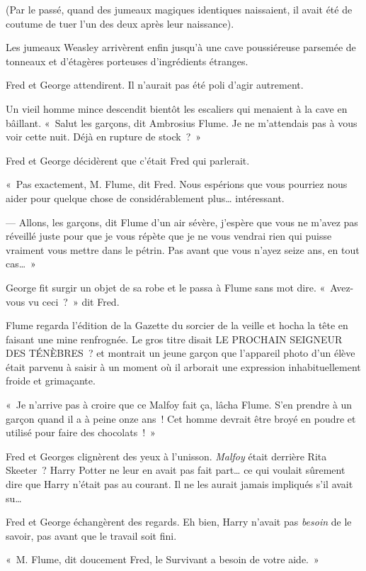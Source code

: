 (Par le passé, quand des jumeaux magiques identiques naissaient, il avait été de coutume de tuer l'un des deux après leur naissance).

Les jumeaux Weasley arrivèrent enfin jusqu'à une cave poussiéreuse parsemée de tonneaux et d'étagères porteuses d'ingrédients étranges.

Fred et George attendirent.
Il n'aurait pas été poli d'agir autrement.

Un vieil homme mince descendit bientôt les escaliers qui menaient à la cave en bâillant.
«~Salut les garçons, dit Ambrosius Flume.
Je ne m'attendais pas à vous voir cette nuit.
Déjà en rupture de stock~?~»

Fred et George décidèrent que c'était Fred qui parlerait.

«~Pas exactement, M. Flume, dit Fred.
Nous espérions que vous pourriez nous aider pour quelque chose de considérablement plus… intéressant.

--- Allons, les garçons, dit Flume d'un air sévère, j'espère que vous ne m'avez pas réveillé juste pour que je vous répète que je ne vous vendrai rien qui puisse vraiment vous mettre dans le pétrin.
Pas avant que vous n'ayez seize ans, en tout cas…~»

George fit surgir un objet de sa robe et le passa à Flume sans mot dire.
«~Avez-vous vu ceci~?~»
dit Fred.

Flume regarda l'édition de la Gazette du sorcier de la veille et hocha la tête en faisant une mine renfrognée.
Le gros titre disait LE PROCHAIN SEIGNEUR DES TÉNÈBRES~? et montrait un jeune garçon que l'appareil photo d'un élève était parvenu à saisir à un moment où il arborait une expression inhabituellement froide et grimaçante.

«~Je n'arrive pas à croire que ce Malfoy fait ça, lâcha Flume.
S'en prendre à un garçon quand il a à peine onze ans~!
Cet homme devrait être broyé en poudre et utilisé pour faire des chocolats~!~»

Fred et Georges clignèrent des yeux à l'unisson.
\emph{Malfoy} était derrière Rita Skeeter~?
Harry Potter ne leur en avait pas fait part… ce qui voulait sûrement dire que Harry n'était pas au courant.
Il ne les aurait jamais impliqués s'il avait su…

Fred et George échangèrent des regards.
Eh bien, Harry n'avait pas \emph{besoin} de le savoir, pas avant que le travail soit fini.

«~M. Flume, dit doucement Fred, le Survivant a besoin de votre aide.~»

